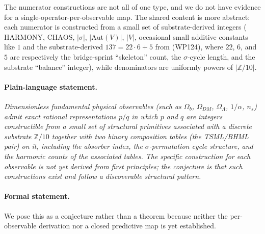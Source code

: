 \documentclass[11pt,reqno]{amsart}
\theoremstyle{plain}
\theoremstyle{definition}
\theoremstyle{remark}
\newcommand{\Z}{\mathbb{Z}}
\newcommand{\Aut}{\mathrm{Aut}}
\begin{document}
The numerator constructions are not all of one type, and we do
not have evidence for a single-operator-per-observable map. The
shared content is more abstract: each numerator is constructed
from a small set of substrate-derived integers
($\mathrm{HARMONY}$, $\mathrm{CHAOS}$, $|\sigma|$, $|\Aut(V)|$,
$|V|$, occasional small additive constants like $1$ and the
substrate-derived $137 = 22 \cdot 6 + 5$ from
\cite{SandersClaudeChat2026BridgeSprint} (WP124), where $22$,
$6$, and $5$ are
respectively the bridge-sprint ``skeleton'' count, the
$\sigma$-cycle length, and the substrate ``balance'' integer),
while denominators are uniformly powers of $|\Z/10|$.

\paragraph{Plain-language statement.}
\emph{Dimensionless fundamental physical observables (such as
$\Omega_b$, $\Omega_{DM}$, $\Omega_\Lambda$, $1/\alpha$, $n_s$)
admit exact rational representations $p/q$ in which $p$ and $q$
are integers constructible from a small set of structural
primitives associated with a discrete substrate
$\Z/10$ together with two binary composition tables (the
TSML/BHML pair) on it, including the absorber index, the
$\sigma$-permutation cycle structure, and the harmonic counts
of the associated tables. The specific construction for each
observable is not yet derived from first principles; the
conjecture is that such constructions exist and follow a
discoverable structural pattern.}

\paragraph{Formal statement.}
We pose this as a conjecture rather than a theorem because
neither the per-observable derivation nor a closed predictive
map is yet established.
\end{document}
